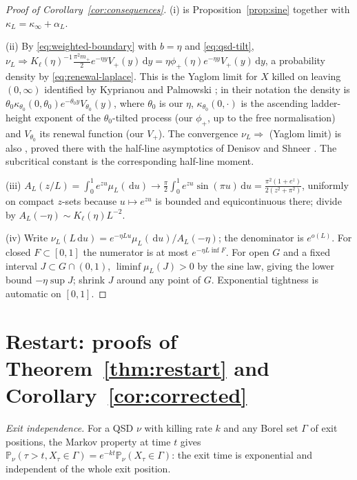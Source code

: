 \documentclass[11pt,a4paper]{article}
\theoremstyle{definition}
\theoremstyle{remark}
\newcommand{\Pp}{\mathbb P}
\newcommand{\1}{\mathbf 1}
\newcommand{\dd}{\,\mathrm d}
\newcommand{\Kl}{K_{\ell}}
\newcommand{\kinf}{\kappa_\infty}
\begin{document}
\begin{proof}[Proof of Corollary~\ref{cor:consequences}]
(i) is Proposition~\ref{prop:sine} together with $\kappa_L=\kinf+\alpha_L$.

(ii) By \eqref{eq:weighted-boundary} with $b=\eta$ and \eqref{eq:qsd-tilt}, $\nu_L\Rightarrow\Kl(\eta)^{-1}\frac{\pi^2m_+}2e^{-\eta y}V_+(y)\dd y=\eta\phi_+(\eta)e^{-\eta y}V_+(y)\dd y$, a probability density by \eqref{eq:renewal-laplace}. This is the Yaglom limit for $X$ killed on leaving $(0,\infty)$ identified by Kyprianou and Palmowski \cite[Theorem 1]{kypalm}; in their notation the density is $\theta_0\kappa_{\theta_0}(0,\theta_0)e^{-\theta_0y}V_{\theta_0}(y)$, where $\theta_0$ is our $\eta$, $\kappa_{\theta_0}(0,\cdot)$ is the ascending ladder-height exponent of the $\theta_0$-tilted process (our $\phi_+$, up to the free normalisation) and $V_{\theta_0}$ its renewal function (our $V_+$).
The convergence $\nu_L\Rightarrow$ (Yaglom limit) is also \cite[Lemma 6.1]{garcia}, proved there with the half-line asymptotics of Denisov and Shneer \cite{denisovshneer}. The subcritical constant is the corresponding half-line moment.

(iii) $A_L(z/L)=\int_0^1e^{zu}\mu_L(\dd u)\to\frac\pi2\int_0^1e^{zu}\sin(\pi u)\dd u=\frac{\pi^2(1+e^z)}{2(z^2+\pi^2)}$, uniformly on compact $z$-sets because $u\mapsto e^{zu}$ is bounded and equicontinuous there; divide by $A_L(-\eta)\sim\Kl(\eta)L^{-2}$.

(iv) Write $\nu_L(L\dd u)=e^{-\eta Lu}\mu_L(\dd u)/A_L(-\eta)$; the denominator is $e^{o(L)}$. For closed $F\subset[0,1]$ the numerator is at most $e^{-\eta L\inf F}$. For open $G$ and a fixed interval $J\subset G\cap(0,1)$, $\liminf\mu_L(J)>0$ by the sine law, giving the lower bound $-\eta\sup J$; shrink $J$ around any point of $G$. Exponential tightness is automatic on $[0,1]$.
\end{proof}

\section{Restart: proofs of Theorem~\ref{thm:restart} and Corollary~\ref{cor:corrected}}\label{sec:restart-proof}
\emph{Exit independence.} For a QSD $\nu$ with killing rate $k$ and any Borel set $\Gamma$ of exit positions, the Markov property at time $t$ gives $\Pp_\nu(\tau>t,X_\tau\in\Gamma)=e^{-kt}\Pp_\nu(X_\tau\in\Gamma)$: the exit time is exponential and independent of the whole exit position.
\end{document}
